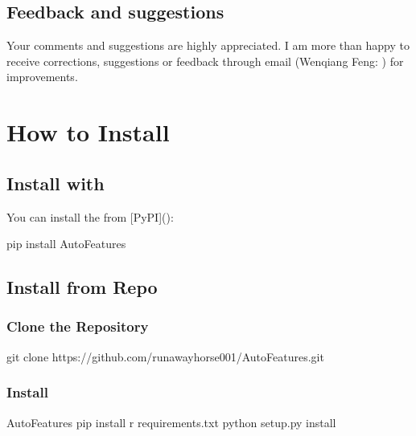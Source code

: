 \documentclass[letterpaper,11pt,english]{sphinxmanual}
\begin{document}
\section{Feedback and suggestions}
\label{\detokenize{preface:feedback-and-suggestions}}
Your comments and suggestions are highly appreciated. I am more than happy to receive
corrections, suggestions or feedback through email (Wenqiang Feng: ) for improvements.


\chapter{How to Install}
\label{\detokenize{install:how-to-install}}\label{\detokenize{install:install}}\label{\detokenize{install::doc}}

\section{Install with }
\label{\detokenize{install:install-with-pip}}
You can install the  from {[}PyPI{]}():

\begin{sphinxVerbatim}[commandchars=\\\{\}]
pip install AutoFeatures
\end{sphinxVerbatim}


\section{Install from Repo}
\label{\detokenize{install:install-from-repo}}

\subsection{Clone the Repository}
\label{\detokenize{install:clone-the-repository}}
\begin{sphinxVerbatim}[commandchars=\\\{\}]
git clone https://github.com/runawayhorse001/AutoFeatures.git
\end{sphinxVerbatim}


\subsection{Install}
\label{\detokenize{install:id1}}
\begin{sphinxVerbatim}[commandchars=\\\{\}]
 AutoFeatures
pip install \PYGZhy{}r requirements.txt
python setup.py install
\end{sphinxVerbatim}
\end{document}
